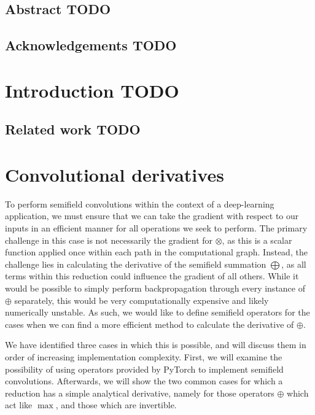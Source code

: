 \documentclass[a4paper, 12pt]{report}
\def\comment#1{\color{red}#1\color{black}}
\begin{document}
\newpage



\setcounter{page}{1}
\pagestyle{plain} 


\section*{Abstract \comment{TODO}}


\section*{Acknowledgements \comment{TODO}}

\tableofcontents


\chapter{Introduction \comment{TODO}}


\newpage
\section{Related work \comment{TODO}}


\chapter{Convolutional derivatives}
To perform semifield convolutions within the context of a deep-learning application, we must ensure that we can take the gradient with respect to our inputs in an efficient manner for all operations we seek to perform. 
The primary challenge in this case is not necessarily the gradient for $\otimes$, as this is a scalar function applied once within each path in the computational graph. Instead, the challenge lies in calculating the derivative of the semifield summation $\bigoplus$, as all terms within this reduction could influence the gradient of all others. While it would be possible to simply perform backpropagation through every instance of $\oplus$ separately, this would be very computationally expensive and likely numerically unstable. As such, we would like to define semifield operators for the cases when we can find a more efficient method to calculate the derivative of $\oplus$.

We have identified three cases in which this is possible, and will discuss them in order of increasing implementation complexity. First, we will examine the possibility of using operators provided by PyTorch to implement semifield convolutions. Afterwards, we will show the two common cases for which a reduction has a simple analytical derivative, namely for those operators $\oplus$ which act like $\max$, and those which are invertible.
\end{document}
